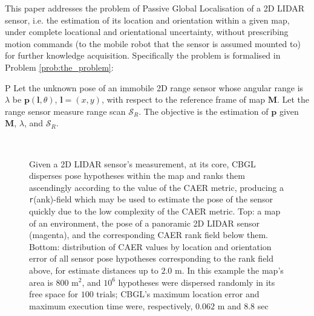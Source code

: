This paper addresses the problem of Passive Global Localisation of a 2D LIDAR
sensor, i.e. the estimation of its location and orientation within a given map,
under complete locational and orientational uncertainty, without prescribing
motion commands (to the mobile robot that the sensor is assumed mounted to) for
further knowledge acquisition. Specifically the problem is formalised in
Problem \ref{prob:the_problem}:

\begin{customprb}{P}
  \label{prob:the_problem}
  Let the unknown pose of an immobile 2D range sensor whose angular range is
  $\lambda$ be $\bm{p}(\bm{l},\theta)$, $\bm{l} = (x,y)$, with respect to the
  reference frame of map $\bm{M}$. Let the range sensor measure range scan
  $\mathcal{S}_R$. The objective is the estimation of $\bm{p}$ given $\bm{M}$,
  $\lambda$, and $\mathcal{S}_R$.
\end{customprb}

\begin{figure}\vspace{0.4em}
  \subfloat{    \label{fig:a}} \vspace{-1.7cm}\\
  \subfloat{\hspace{-0.3cm} \label{fig:b}}
  \caption{\small
           Given a 2D LIDAR sensor's measurement, at its core, CBGL disperses
           pose hypotheses within the map and ranks them ascendingly according
           to the value of the CAER metric, producing a \texttt{r}(ank)-field
           which may be used to estimate the pose of the sensor quickly due to
           the low complexity of the CAER metric.
           Top: a map of an environment, the pose of a panoramic 2D LIDAR sensor
           (magenta), and the corresponding CAER rank field below them.
           Bottom: distribution of CAER values by location and orientation
           error of all sensor pose hypotheses corresponding to the rank field
           above, for estimate distances up to $2.0$ m.
           In this example the map's area is $800$ m$^2$, and $10^6$ hypotheses
           were dispersed randomly in its free space for $100$ trials; CBGL's
           maximum location error and maximum execution time were,
           respectively, $0.062$ m and $8.8$ sec
           }
  \vspace{-0.75cm}
  \label{fig:face}
\end{figure}
